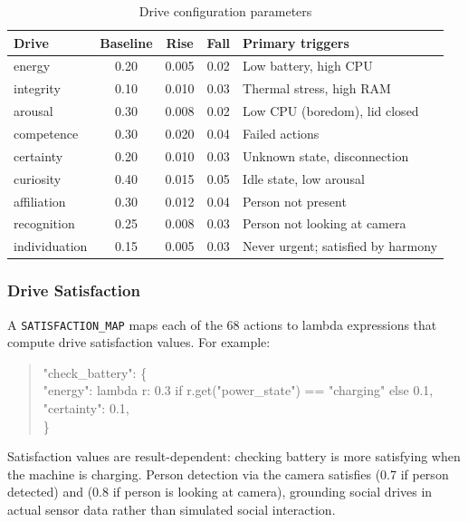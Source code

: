 \documentclass[11pt,oneside]{article}
\begin{document}
\begin{table}[H]
\centering
\caption{Drive configuration parameters}
\label{tab:drives}
\small
\begin{tabular}{l c c c l}
\toprule
\textbf{Drive} & \textbf{Baseline} & \textbf{Rise} & \textbf{Fall} & \textbf{Primary triggers} \\
\midrule
energy        & 0.20 & 0.005 & 0.02 & Low battery, high CPU \\
integrity     & 0.10 & 0.010 & 0.03 & Thermal stress, high RAM \\
arousal       & 0.30 & 0.008 & 0.02 & Low CPU (boredom), lid closed \\
competence    & 0.30 & 0.020 & 0.04 & Failed actions \\
certainty     & 0.20 & 0.010 & 0.03 & Unknown state, disconnection \\
curiosity     & 0.40 & 0.015 & 0.05 & Idle state, low arousal \\
affiliation   & 0.30 & 0.012 & 0.04 & Person not present \\
recognition   & 0.25 & 0.008 & 0.03 & Person not looking at camera \\
individuation & 0.15 & 0.005 & 0.03 & Never urgent; satisfied by harmony \\
\bottomrule
\end{tabular}
\end{table}

\subsubsection{Drive Satisfaction}

A \texttt{SATISFACTION\_MAP} maps each of the 68 actions to lambda expressions that compute drive satisfaction values.
For example:

\begin{quote}
\ttfamily\small
"check\_battery": \{\\
\quad "energy": lambda r: 0.3 if r.get("power\_state") == "charging" else 0.1,\\
\quad "certainty": 0.1,\\
\}
\end{quote}

Satisfaction values are result-dependent: checking battery is more satisfying when the machine is charging.
Person detection via the camera satisfies  (0.7 if person detected) and  (0.8 if person is looking at camera), grounding social drives in actual sensor data rather than simulated social interaction.
\end{document}
